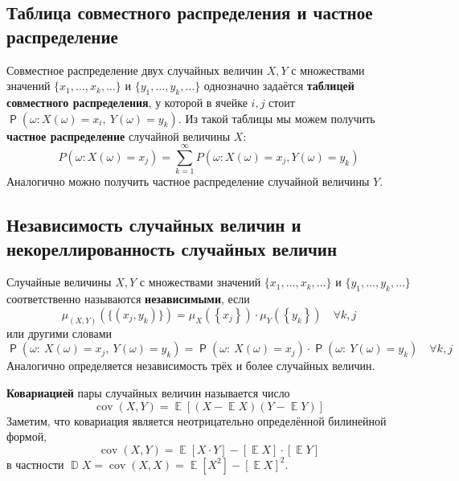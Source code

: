 \documentclass[12pt]{article}
\DeclareMathOperator{\mexp}{\mathbb{E}}
\DeclareMathOperator{\var}{\mathbb{D}}
\DeclareMathOperator{\prob}{\mathsf{P}}
\DeclareMathOperator{\cov}{cov}
\begin{document}
    \subsection{Таблица совместного распределения и частное распределение}
    Совместное распределение двух случайных величин $X,Y$ с множествами значений $\lbrace x_1, \ldots, x_k, \ldots \rbrace$ и $\lbrace y_1, \ldots, y_k, \ldots\rbrace$ однозначно задаётся \textbf{таблицей совместного распределения}, у которой в ячейке $i,j$ стоит $\prob (\omega: X(\omega) = x_i,\ Y(\omega) = y_k)$. Из такой таблицы мы можем получить \textbf{частное распределение} случайной величины $X$: 
    \begin{equation*}
        P(\omega: X(\omega) = x_j) = \sum_{k=1}^{\infty} P(\omega: X(\omega) = x_j, Y(\omega) = y_k)    
    \end{equation*}
    Аналогично можно получить частное распределение случайной величины $Y.$

    \subsection{Независимость случайных величин и некореллированность случайных величин}
    Случайные величины $X, Y$ с множествами значений $\lbrace x_1, \ldots, x_k, \ldots \rbrace$ и $\lbrace y_1, \ldots, y_k, \ldots\rbrace$ соответственно называются \textbf{независимыми}, если
    \begin{equation*}
        \mu_{\left(X,Y\right)}\left(\lbrace \left(x_j, y_k\right)\rbrace\right) = \mu_X \left(\left\{x_j\right\}\right) \cdot \mu_Y \left(\left\{y_k\right\}\right)\hspace{1em} \forall k,j
    \end{equation*}
    или другими словами
    \begin{equation*}
        \prob(\omega:\ X(\omega) = x_j,\ Y(\omega) = y_k) = \prob(\omega:\ X(\omega) = x_j) \cdot \prob(\omega:\ Y(\omega) = y_k)\hspace{1em} \forall k,j
    \end{equation*}
    Аналогично определяется независимость трёх и более случайных величин.
    
    \textbf{Ковариацией} пары случайных величин называется число 
    \begin{equation*}
        \cov(X, Y) = \mexp\left[\left(X - \mexp X\right)\left(Y - \mexp Y\right)\right]
    \end{equation*}
    Заметим, что ковариация является неотрицательно определённой билинейной формой,
    \begin{equation*}
        \cov(X,Y) = \mexp\left[X \cdot Y\right] - \left[\mexp X\right] \cdot \left[\mexp Y\right]
    \end{equation*}
    в частности $\var X = \cov(X, X) = \mexp \left[X^2\right] - \left[\mexp X\right]^2$.
\end{document}
